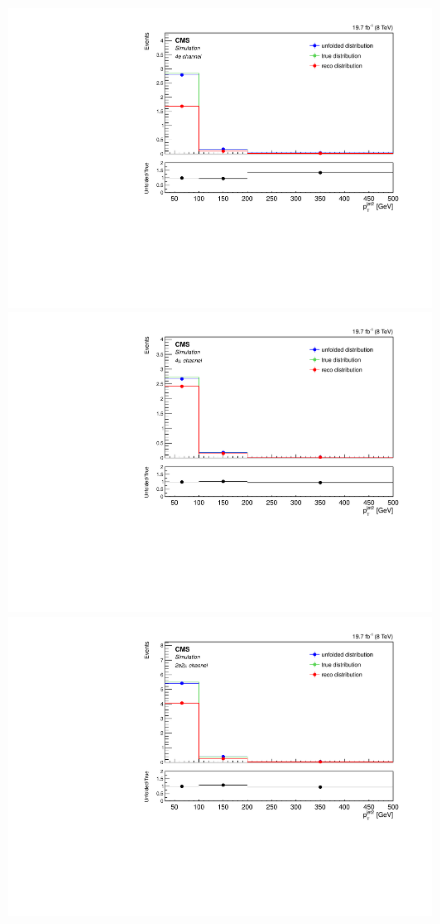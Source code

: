 \begin{figure}[hbtp]
\begin{center}
    \includegraphics[width=0.8\cmsFigWidth]{Figures/Unfolding/MCTests/PtJet2_ZZTo4e_PowMatrix_PowDistr_HalfSample_fr}     
    \includegraphics[width=0.8\cmsFigWidth]{Figures/Unfolding/MCTests/PtJet2_ZZTo4m_PowMatrix_PowDistr_HalfSample_fr}     
 \includegraphics[width=0.8\cmsFigWidth]{Figures/Unfolding/MCTests/PtJet2_ZZTo2e2m_PowMatrix_PowDistr_HalfSample_fr}        

\end{center}
\end{figure}
